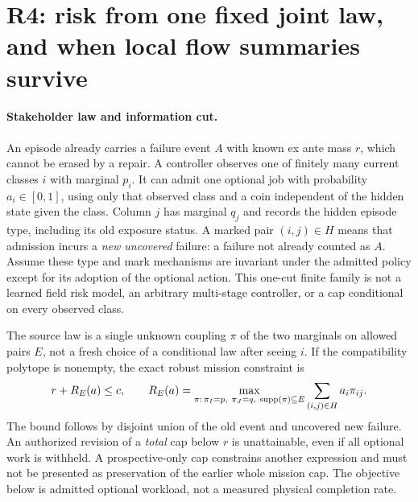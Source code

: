 \documentclass{article}
\begin{document}
\section*{R4: risk from one fixed joint law, and when local flow summaries survive}
\paragraph{Stakeholder law and information cut.}
An episode already carries a failure event \(A\) with known
ex ante mass \(r\), which cannot be erased by a repair.
A controller observes one of finitely many current classes \(i\)
with marginal \(p_i\). It can admit one optional job with probability
\(a_i\in[0,1]\), using only that observed class and a coin independent of
the hidden state given the class. Column \(j\) has marginal \(q_j\)
and records the hidden episode type, including its old exposure status.
A marked pair \((i,j)\in H\) means that admission incurs a
\emph{new uncovered} failure: a failure not already counted as \(A\).
Assume these type and mark mechanisms are invariant under the admitted
policy except for its adoption of the optional action.
This one-cut finite family is not a learned field risk model,
an arbitrary multi-stage controller, or a cap conditional on every
observed class.

The source law is a single unknown coupling \(\pi\) of the two marginals
on allowed pairs \(E\), not a fresh choice of a conditional law after
seeing \(i\). If the compatibility polytope is nonempty, the exact
robust mission constraint is
\[
 r+R_E(a)\le c,\qquad
 R_E(a)=\max_{\pi:\,\pi_I=p,\ \pi_J=q,\ {\rm supp}(\pi)\subseteq E}
             \sum_{(i,j)\in H}a_i\pi_{ij}.
\]
The bound follows by disjoint union of the old event and uncovered
new failure. An authorized revision of a \emph{total} cap below \(r\)
is unattainable, even if all optional work is withheld.
A prospective-only cap constrains another expression and must not
be presented as preservation of the earlier whole mission cap.
The objective below is admitted optional workload, not a measured
physical completion rate.
\end{document}
